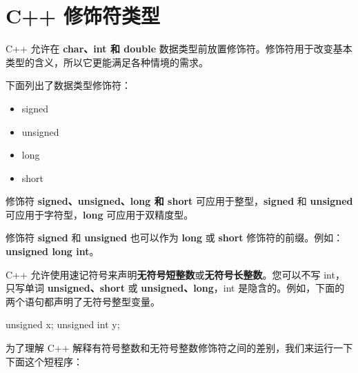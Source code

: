 \documentclass[
]{article}
\newenvironment{Shaded}{}{}
\newcommand{\DataTypeTok}[1]{\textcolor[rgb]{0.56,0.13,0.00}{#1}}
\newcommand{\NormalTok}[1]{#1}
\newcommand{\OperatorTok}[1]{\textcolor[rgb]{0.40,0.40,0.40}{#1}}
\providecommand{\tightlist}{%
  \setlength{\itemsep}{0pt}\setlength{\parskip}{0pt}}
\begin{document}
\hypertarget{c-ux4feeux9970ux7b26ux7c7bux578b}{%
\section{C++ 修饰符类型}\label{c-ux4feeux9970ux7b26ux7c7bux578b}}

C++ 允许在 \textbf{char、int 和 double}
数据类型前放置修饰符。修饰符用于改变基本类型的含义，所以它更能满足各种情境的需求。

下面列出了数据类型修饰符：

\begin{itemize}
\tightlist
\item
  signed
\item
  unsigned
\item
  long
\item
  short
\end{itemize}

修饰符 \textbf{signed、unsigned、long 和 short}
可应用于整型，\textbf{signed} 和 \textbf{unsigned}
可应用于字符型，\textbf{long} 可应用于双精度型。

修饰符 \textbf{signed} 和 \textbf{unsigned} 也可以作为 \textbf{long} 或
\textbf{short} 修饰符的前缀。例如：\textbf{unsigned long int}。

C++
允许使用速记符号来声明\textbf{无符号短整数}或\textbf{无符号长整数}。您可以不写
int，只写单词 \textbf{unsigned、short} 或 \textbf{unsigned、long}，int
是隐含的。例如，下面的两个语句都声明了无符号整型变量。

\begin{Shaded}
\begin{Highlighting}[]
\DataTypeTok{unsigned}\NormalTok{ x}\OperatorTok{;}
\DataTypeTok{unsigned} \DataTypeTok{int}\NormalTok{ y}\OperatorTok{;}
\end{Highlighting}
\end{Shaded}

为了理解 C++
解释有符号整数和无符号整数修饰符之间的差别，我们来运行一下下面这个短程序：
\end{document}
